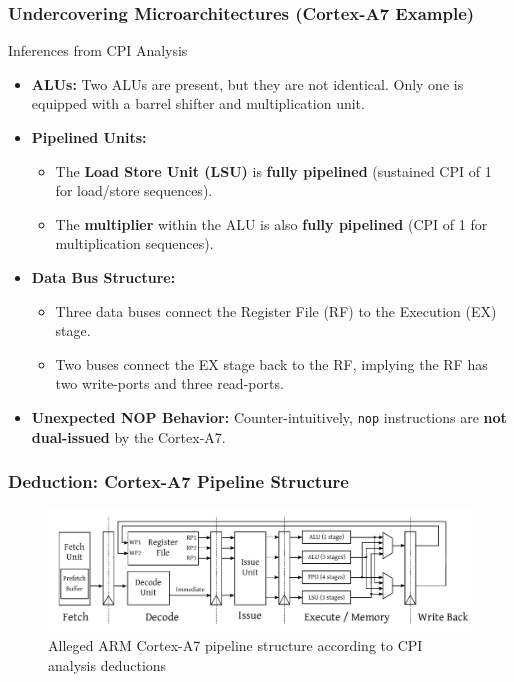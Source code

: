 \begin{frame}
    \frametitle{Undercovering Microarchitectures (Cortex-A7 Example)}
    \begin{block}{Inferences from CPI Analysis}
        \begin{itemize}
            \item \textbf{ALUs:} Two ALUs are present, but they are not identical. Only one is equipped with a barrel shifter and multiplication unit.
            \item \textbf{Pipelined Units:}
                \begin{itemize}
                    \item The \textbf{Load Store Unit (LSU)} is \textbf{fully pipelined} (sustained CPI of 1 for load/store sequences).
                    \item The \textbf{multiplier} within the ALU is also \textbf{fully pipelined} (CPI of 1 for multiplication sequences).
                \end{itemize}
            \item \textbf{Data Bus Structure:}
                \begin{itemize}
                    \item Three data buses connect the Register File (RF) to the Execution (EX) stage.
                    \item Two buses connect the EX stage back to the RF, implying the RF has two write-ports and three read-ports.
                \end{itemize}
            \item \textbf{Unexpected NOP Behavior:} Counter-intuitively, \texttt{nop} instructions are \textbf{not dual-issued} by the Cortex-A7.
        \end{itemize}
    \end{block}
\end{frame}

\begin{frame}
    \frametitle{Deduction: Cortex-A7 Pipeline Structure}
    \begin{figure}
        \centering
        \includegraphics[width=1.0\textwidth]{Pictures/cortexUncovered.png}
        \caption{Alleged ARM Cortex-A7 pipeline structure according to CPI analysis deductions }
        \label{fig:deduced-pipeline}
    \end{figure}
\end{frame}

